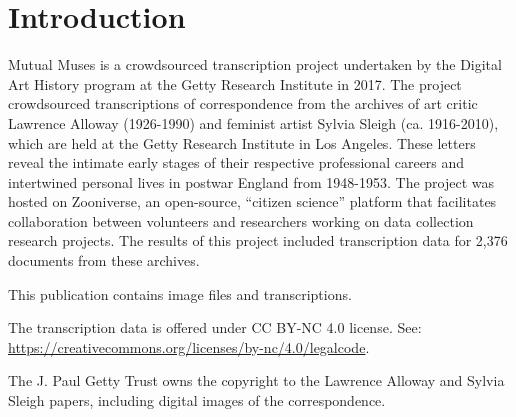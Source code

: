 \makeatletter
\renewcommand*\cleardoublepage{\clearpage\if@twoside
  \ifodd\c@page \hbox{}\newpage\if@twocolumn\hbox{}%
  \newpage\fi\fi\fi}
\makeatother

\chapter*{Introduction}

Mutual Muses is a crowdsourced transcription project undertaken by the Digital Art History program at the Getty Research Institute in 2017. The project crowdsourced transcriptions of correspondence from the archives of art critic Lawrence Alloway (1926-1990) and feminist artist Sylvia Sleigh (ca. 1916-2010), which are held at the Getty Research Institute in Los Angeles. These letters reveal the intimate early stages of their respective professional careers and intertwined personal lives in postwar England from 1948-1953. The project was hosted on Zooniverse, an open-source, ``citizen science'' platform that facilitates collaboration between volunteers and researchers working on data collection research projects. The results of this project included transcription data for 2,376 documents from these archives.

This publication contains image files and transcriptions.

The transcription data is offered under CC BY-NC 4.0 license. See: \url{https://creativecommons.org/licenses/by-nc/4.0/legalcode}.

The J. Paul Getty Trust owns the copyright to the Lawrence Alloway and Sylvia Sleigh papers, including digital images of the correspondence.
